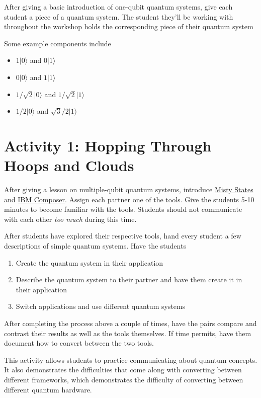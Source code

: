 \documentclass{article}
\begin{document}
After giving a basic introduction of one-qubit quantum systems, give each student a piece of a quantum system. The student they'll be working with throughout the workshop holds the corresponding piece of their quantum system

Some example components include

\begin{itemize}
    \item $1|0\rangle$ and $0|1\rangle$
    \item $0|0\rangle$ and $1|1\rangle$
    \item $1/\sqrt{2} |0\rangle$ and $1/\sqrt{2} |1\rangle$
    \item $1/2 |0\rangle$ and $\sqrt{3}/2 |1\rangle$
\end{itemize}

\section{Activity 1: Hopping Through Hoops and Clouds}

After giving a lesson on multiple-qubit quantum systems, introduce \href{https://quantumcurious.org/misty-states/}{Misty States} and \href{https://quantum.ibm.com/composer/files/new}{IBM Composer}. Assign each partner one of the tools. Give the students 5-10 minutes to become familiar with the tools. Students should not communicate with each other \textit{too much} during this time.

After students have explored their respective tools, hand every student a few descriptions of simple quantum systems. Have the students 

\begin{enumerate}
    \item Create the quantum system in their application
    \item Describe the quantum system to their partner and have them create it in their application
    \item Switch applications and use different quantum systems
\end{enumerate}

After completing the process above a couple of times, have the pairs compare and contrast their results as well as the tools themselves. If time permits, have them document how to convert between the two tools.

This activity allows students to practice communicating about quantum concepts. It also demonstrates the difficulties that come along with converting between different frameworks, which demonstrates the difficulty of converting between different quantum hardware.
\end{document}
